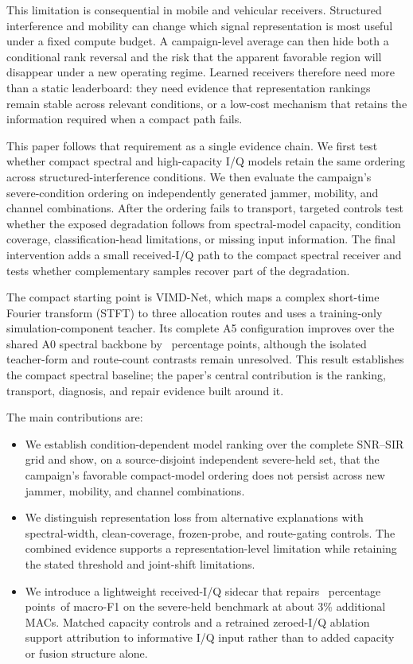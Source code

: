 \documentclass[letterpaper,journal]{IEEEtran}
\newcommand{\method}{VIMD-Net}
\newcommand{\pp}{percentage points}
\begin{document}
This limitation is consequential in mobile and vehicular receivers. Structured
interference and mobility can change which signal representation is most useful
under a fixed compute budget. A campaign-level average can then hide both a
conditional rank reversal and the risk that the apparent favorable region will
disappear under a new operating regime. Learned receivers therefore need more
than a static leaderboard: they need evidence that representation rankings
remain stable across relevant conditions, or a low-cost mechanism that retains
the information required when a compact path fails.

This paper follows that requirement as a single evidence chain. We first test
whether compact spectral and high-capacity I/Q models retain the same ordering
across structured-interference conditions. We then evaluate the campaign's
severe-condition ordering on independently generated jammer, mobility, and
channel combinations. After the ordering fails to transport, targeted controls
test whether the exposed degradation follows from spectral-model capacity,
condition coverage, classification-head limitations, or missing input
information. The final intervention adds a small received-I/Q path to the
compact spectral receiver and tests whether complementary samples recover part
of the degradation.

The compact starting point is \method, which maps a complex short-time Fourier
transform (STFT) to three allocation routes and uses a training-only
simulation-component teacher. Its complete A5 configuration improves over the
shared A0 spectral backbone by \MethodEffectDiff\ \pp, although the isolated
teacher-form and route-count contrasts remain unresolved. This result
establishes the compact spectral baseline; the paper's central contribution is
the ranking, transport, diagnosis, and repair evidence built around it.

The main contributions are:
\begin{itemize}
  \item We establish condition-dependent model ranking over the complete
  SNR--SIR grid and show, on a source-disjoint independent severe-held set,
  that the campaign's favorable compact-model ordering does not persist across
  new jammer, mobility, and channel combinations.
  \item We distinguish representation loss from alternative explanations with
  spectral-width, clean-coverage, frozen-probe, and route-gating controls. The
  combined evidence supports a representation-level limitation while retaining the
  stated threshold and joint-shift limitations.
  \item We introduce a lightweight received-I/Q sidecar that repairs
  \SevereRepairDiff\ \pp\ of macro-F1 on the severe-held benchmark at about
  3\% additional MACs. Matched capacity controls and a retrained zeroed-I/Q
  ablation support attribution to informative I/Q input rather than to added
  capacity or fusion structure alone.
\end{itemize}
\end{document}
